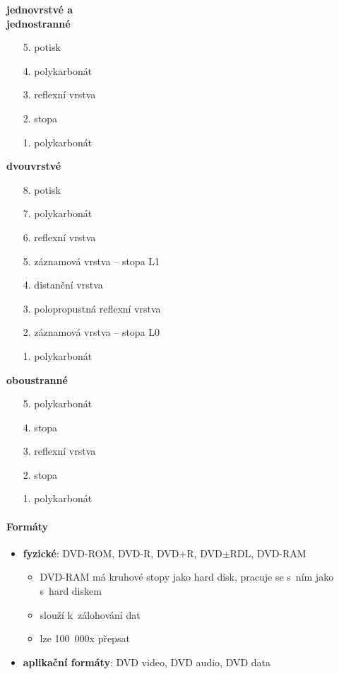\documentclass[a4paper,12pt]{article}
\providecommand{\tightlist}{%
\setlength{\itemsep}{0pt}\setlength{\parskip}{0pt}}
\begin{document}
\begin{minipage}[t]{0.3\textwidth}
  \textbf{jednovrstvé a~\\jednostranné}
  \begin{itemize}
    \tightlist
    \item[5.] potisk
    \item[4.] polykarbonát
    \item[3.] reflexní vrstva
    \item[2.] stopa
    \item[1.] polykarbonát
  \end{itemize}
\end{minipage}%
\begin{minipage}[t]{0.4\textwidth}
  \textbf{dvouvrstvé}
  \begin{itemize}
    \tightlist
    \item[8.] potisk
    \item[7.] polykarbonát
    \item[6.] reflexní vrstva
    \item[5.] záznamová vrstva -- stopa L1
    \item[4.] distanční vrstva
    \item[3.] polopropustná reflexní vrstva
    \item[2.] záznamová vrstva -- stopa L0
    \item[1.] polykarbonát
  \end{itemize}
\end{minipage}%
\begin{minipage}[t]{0.3\textwidth}
  \textbf{oboustranné}
  \begin{itemize}
    \tightlist
    \item[5.] polykarbonát
    \item[4.] stopa
    \item[3.] reflexní vrstva
    \item[2.] stopa
    \item[1.] polykarbonát
  \end{itemize}
\end{minipage}

\vspace{5mm}

\paragraph{Formáty}

\begin{itemize}
  \tightlist
  \item \textbf{fyzické}: DVD-ROM, DVD-R, DVD+R, DVD$\pm$RDL, DVD-RAM
  \begin{itemize}
    \tightlist
    \item DVD-RAM má kruhové stopy jako hard disk, pracuje se s~ním jako s~hard
    diskem
    \item slouží k~zálohování dat
    \item lze 100~000x přepsat
  \end{itemize}
  \item \textbf{aplikační formáty}: DVD video, DVD audio, DVD data
\end{itemize}
\end{document}
